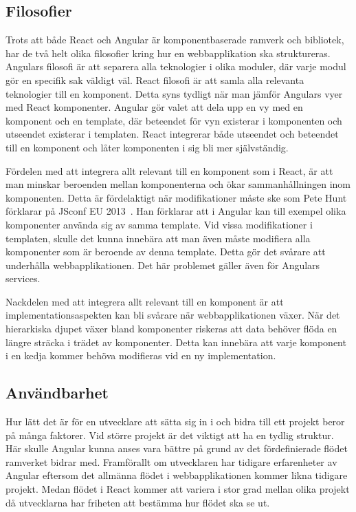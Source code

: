 \subsection{Filosofier}
Trots att både React och Angular är komponentbaserade ramverk och bibliotek, har de två helt olika filosofier kring hur en webbapplikation ska struktureras. Angulars filosofi är att separera alla teknologier i olika moduler, där varje modul gör en specifik sak väldigt väl. React filosofi är att samla alla relevanta teknologier till en komponent. Detta syns tydligt när man jämför Angulars vyer med React komponenter. Angular gör valet att dela upp en vy med en komponent och en template, där beteendet för vyn existerar i komponenten och utseendet existerar i templaten. React integrerar både utseendet och beteendet till en komponent och låter komponenten i sig bli mer självständig. 

Fördelen med att integrera allt relevant till en komponent som i React, är att man minskar beroenden mellan komponenterna och ökar sammanhållningen inom komponenten. Detta är fördelaktigt när modifikationer måste ske som Pete Hunt förklarar på JSconf EU 2013~\cite{JSConf}. Han förklarar att i Angular kan till exempel olika komponenter använda sig av samma template. Vid vissa modifikationer i templaten, skulle det kunna innebära att man även måste modifiera alla komponenter som är beroende av denna template. Detta gör det svårare att underhålla webbapplikationen. Det här problemet gäller även för Angulars services.

Nackdelen med att integrera allt relevant till en komponent är att implementationsaspekten kan bli svårare när webbapplikationen växer. När det hierarkiska djupet växer bland komponenter riskeras att data behöver flöda en längre sträcka i trädet av komponenter. Detta kan innebära att varje komponent i en kedja kommer behöva modifieras vid en ny implementation.


\subsection{Användbarhet}
Hur lätt det är för en utvecklare att sätta sig in i och bidra till ett projekt beror på många faktorer. Vid större projekt är det viktigt att ha en tydlig struktur. Här skulle Angular kunna anses vara bättre på grund av det fördefinierade flödet ramverket bidrar med. Framförallt om utvecklaren har tidigare erfarenheter av Angular eftersom det allmänna flödet i webbapplikationen kommer likna tidigare projekt. Medan flödet i React kommer att variera i stor grad mellan olika projekt då utvecklarna har friheten att bestämma hur flödet ska se ut. 


